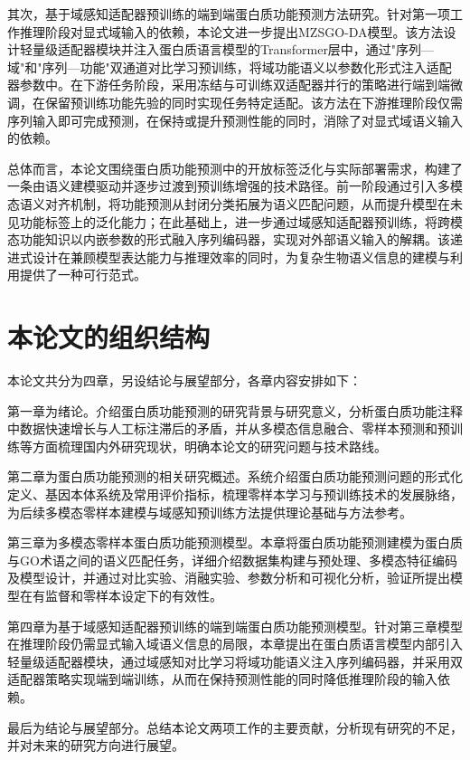 其次，基于域感知适配器预训练的端到端蛋白质功能预测方法研究。针对第一项工作推理阶段对显式域输入的依赖，本论文进一步提出MZSGO-DA模型。该方法设计轻量级适配器模块并注入蛋白质语言模型的Transformer层中，通过"序列—域"和"序列—功能"双通道对比学习预训练，将域功能语义以参数化形式注入适配器参数中。在下游任务阶段，采用冻结与可训练双适配器并行的策略进行端到端微调，在保留预训练功能先验的同时实现任务特定适配。该方法在下游推理阶段仅需序列输入即可完成预测，在保持或提升预测性能的同时，消除了对显式域语义输入的依赖。

总体而言，本论文围绕蛋白质功能预测中的开放标签泛化与实际部署需求，构建了一条由语义建模驱动并逐步过渡到预训练增强的技术路径。前一阶段通过引入多模态语义对齐机制，将功能预测从封闭分类拓展为语义匹配问题，从而提升模型在未见功能标签上的泛化能力；在此基础上，进一步通过域感知适配器预训练，将跨模态功能知识以内嵌参数的形式融入序列编码器，实现对外部语义输入的解耦。该递进式设计在兼顾模型表达能力与推理效率的同时，为复杂生物语义信息的建模与利用提供了一种可行范式。

\section{本论文的组织结构}

本论文共分为四章，另设结论与展望部分，各章内容安排如下：

第一章为绪论。介绍蛋白质功能预测的研究背景与研究意义，分析蛋白质功能注释中数据快速增长与人工标注滞后的矛盾，并从多模态信息融合、零样本预测和预训练等方面梳理国内外研究现状，明确本论文的研究问题与技术路线。

第二章为蛋白质功能预测的相关研究概述。系统介绍蛋白质功能预测问题的形式化定义、基因本体系统及常用评价指标，梳理零样本学习与预训练技术的发展脉络，为后续多模态零样本建模与域感知预训练方法提供理论基础与方法参考。

第三章为多模态零样本蛋白质功能预测模型。本章将蛋白质功能预测建模为蛋白质与GO术语之间的语义匹配任务，详细介绍数据集构建与预处理、多模态特征编码及模型设计，并通过对比实验、消融实验、参数分析和可视化分析，验证所提出模型在有监督和零样本设定下的有效性。

第四章为基于域感知适配器预训练的端到端蛋白质功能预测模型。针对第三章模型在推理阶段仍需显式输入域语义信息的局限，本章提出在蛋白质语言模型内部引入轻量级适配器模块，通过域感知对比学习将域功能语义注入序列编码器，并采用双适配器策略实现端到端训练，从而在保持预测性能的同时降低推理阶段的输入依赖。

最后为结论与展望部分。总结本论文两项工作的主要贡献，分析现有研究的不足，并对未来的研究方向进行展望。